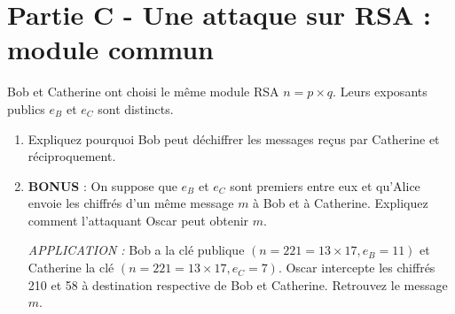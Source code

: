 {{\section*{Partie C - Une attaque sur RSA : module commun}

Bob et Catherine ont choisi le même module RSA \(n = p \times q\). Leurs exposants publics \(e_B\) et \(e_C\) sont distincts.

\begin{enumerate}
    \item Expliquez pourquoi Bob peut déchiffrer les messages reçus par Catherine et réciproquement.
    
    \item \textbf{BONUS} : On suppose que \(e_B\) et \(e_C\) sont premiers entre eux et qu'Alice envoie les chiffrés d'un même message \(m\) à Bob et à Catherine. Expliquez comment l'attaquant Oscar peut obtenir \(m\).
    
    \textit{APPLICATION :} Bob a la clé publique \((n = 221 = 13 \times 17, e_B = 11)\) et Catherine la clé \((n = 221 = 13 \times 17, e_C = 7)\). Oscar intercepte les chiffrés 210 et 58 à destination respective de Bob et Catherine. Retrouvez le message \(m\).
\end{enumerate}




















}}